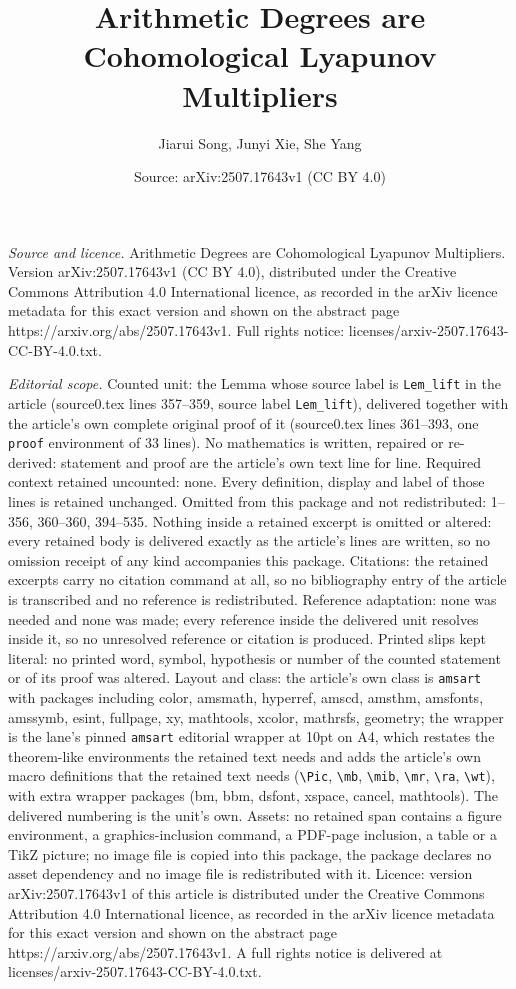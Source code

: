 \documentclass[10pt,a4paper]{amsart}
\title[Arithmetic Degrees are Cohomological Lyapunov Multipliers]{Arithmetic Degrees are Cohomological Lyapunov Multipliers}
\author{Jiarui Song, Junyi Xie, She Yang}
\date{Source: arXiv:2507.17643v1 (CC BY 4.0)}
\begin{document}
\maketitle

\noindent\emph{Source and licence.} Arithmetic Degrees are Cohomological Lyapunov Multipliers. Version arXiv:2507.17643v1 (CC BY 4.0), distributed under the Creative Commons Attribution 4.0 International licence, as recorded in the arXiv licence metadata for this exact version and shown on the abstract page https://arxiv.org/abs/2507.17643v1. Full rights notice: licenses/arxiv-2507.17643-CC-BY-4.0.txt.\par\smallskip

\noindent\textit{Editorial scope.} Counted unit: the Lemma whose source label is \texttt{Lem\_lift} in the article (source0.tex lines 357--359, source label \texttt{Lem\_lift}), delivered together with the article's own complete original proof of it (source0.tex lines 361--393, one \texttt{proof} environment of 33 lines). No mathematics is written, repaired or re-derived: statement and proof are the article's own text line for line. Required context retained uncounted: none. Every definition, display and label of those lines is retained unchanged. Omitted from this package and not redistributed: 1--356, 360--360, 394--535. Nothing inside a retained excerpt is omitted or altered: every retained body is delivered exactly as the article's lines are written, so no omission receipt of any kind accompanies this package. Citations: the retained excerpts carry no citation command at all, so no bibliography entry of the article is transcribed and no reference is redistributed. Reference adaptation: none was needed and none was made; every reference inside the delivered unit resolves inside it, so no unresolved reference or citation is produced. Printed slips kept literal: no printed word, symbol, hypothesis or number of the counted statement or of its proof was altered. Layout and class: the article's own class is \texttt{amsart} with packages including color, amsmath, hyperref, amscd, amsthm, amsfonts, amssymb, esint, fullpage, xy, mathtools, xcolor, mathrsfs, geometry; the wrapper is the lane's pinned \texttt{amsart} editorial wrapper at 10pt on A4, which restates the theorem-like environments the retained text needs and adds the article's own macro definitions that the retained text needs (\texttt{\textbackslash Pic}, \texttt{\textbackslash mb}, \texttt{\textbackslash mib}, \texttt{\textbackslash mr}, \texttt{\textbackslash ra}, \texttt{\textbackslash wt}), with extra wrapper packages (bm, bbm, dsfont, xspace, cancel, mathtools). The delivered numbering is the unit's own. Assets: no retained span contains a figure environment, a graphics-inclusion command, a PDF-page inclusion, a table or a TikZ picture; no image file is copied into this package, the package declares no asset dependency and no image file is redistributed with it. Licence: version arXiv:2507.17643v1 of this article is distributed under the Creative Commons Attribution 4.0 International licence, as recorded in the arXiv licence metadata for this exact version and shown on the abstract page https://arxiv.org/abs/2507.17643v1. A full rights notice is delivered at licenses/arxiv-2507.17643-CC-BY-4.0.txt. 
\end{document}
